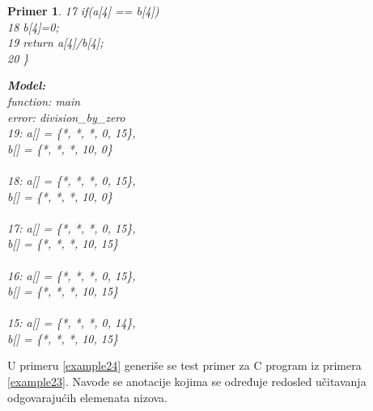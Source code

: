 \documentclass[12pt,oneside]{memoir}
\newcommand\tab[1][0.5cm]{\hspace*{#1}}
\newtheorem{primer}{Primer}
\begin{document}
\begin{primer}
\begin{minipage}[b]{0.5\textwidth}
17	\hspace{-0.08cm} \tab if(a[4] == b[4]) \\
18	\hspace{-0.08cm} \tab \tab	b[4]=0; \\
19	\hspace{-0.08cm} \tab return a[4]/b[4]; \\
20 \}
\end{minipage}
\hspace{1.1cm}
\begin{minipage}[t]{0.4\textwidth}
\vspace{-12.98cm}
\textbf{Model:}\\
function: main \\
error: division\_by\_zero \\
19: a[] = \{*, *, *, 0, 15\}, \\ b[] = \{*, *, *, 10, 0\} \\ \\
18: a[] = \{*, *, *, 0, 15\}, \\ b[] = \{*, *, *, 10, 0\} \\ \\
17: a[] = \{*, *, *, 0, 15\}, \\ b[] = \{*, *, *, 10, 15\} \\ \\
16:	a[] = \{*, *, *, 0, 15\}, \\ b[] = \{*, *, *, 10, 15\} \\ \\
15: a[] = \{*, *, *, 0, 14\}, \\ b[] = \{*, *, *, 10, 15\}
\end{minipage}
\end{primer} 
\par
U primeru \ref{example24} generiše se test primer za C program iz primera \ref{example23}. Navode se anotacije kojima se određuje redosled učitavanja odgovarajućih elemenata nizova.
 
\end{document}
